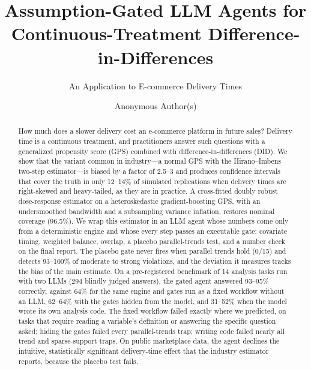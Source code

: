 \documentclass[sigconf,anonymous,review]{acmart}
\begin{document}
\title{Assumption-Gated LLM Agents for Continuous-Treatment Difference-in-Differences}
\subtitle{An Application to E-commerce Delivery Times}

\author{Anonymous Author(s)}

\begin{abstract}
How much does a slower delivery cost an e-commerce platform in future sales? Delivery time is a continuous treatment, and practitioners answer such questions with a generalized propensity score (GPS) combined with difference-in-differences (DID). We show that the variant common in industry---a normal GPS with the Hirano--Imbens two-step estimator---is biased by a factor of 2.5--3 and produces confidence intervals that cover the truth in only 12--14\% of simulated replications when delivery times are right-skewed and heavy-tailed, as they are in practice. A cross-fitted doubly robust dose-response estimator on a heteroskedastic gradient-boosting GPS, with an undersmoothed bandwidth and a subsampling variance inflation, restores nominal coverage (96.5\%). We wrap this estimator in an LLM agent whose numbers come only from a deterministic engine and whose every step passes an executable gate: covariate timing, weighted balance, overlap, a placebo parallel-trends test, and a number check on the final report. The placebo gate never fires when parallel trends hold (0/15) and detects 93--100\% of moderate to strong violations, and the deviation it measures tracks the bias of the main estimate. On a pre-registered benchmark of 14 analysis tasks run with two LLMs (294 blindly judged answers), the gated agent answered 93--95\% correctly, against 64\% for the same engine and gates run as a fixed workflow without an LLM, 62--64\% with the gates hidden from the model, and 31--52\% when the model wrote its own analysis code. The fixed workflow failed exactly where we predicted, on tasks that require reading a variable's definition or answering the specific question asked; hiding the gates failed every parallel-trends trap; writing code failed nearly all trend and sparse-support traps. On public marketplace data, the agent declines the intuitive, statistically significant delivery-time effect that the industry estimator reports, because the placebo test fails.
\end{abstract}

\end{document}
